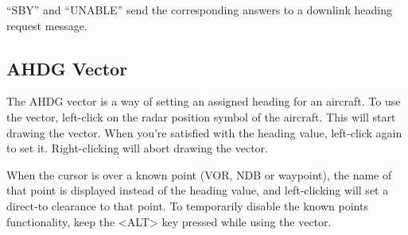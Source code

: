 \documentclass[a4paper,oneside,11pt]{memoir}
\begin{document}
\bigskip

“SBY” and “UNABLE” send the corresponding answers to a downlink heading request
message.


\subsection{AHDG Vector}\label{menu:ahdgv}

The AHDG vector is a way of setting an assigned heading for an aircraft. To use the vector, left-click on the radar position symbol of the aircraft. This will start drawing the vector. When you’re satisfied with the heading value, left-click again to set it. Right-clicking will abort drawing the vector.

\bigskip

When the cursor is over a known point (VOR, NDB or waypoint), the name of that point is displayed instead of the heading value, and left-clicking will set a direct-to clearance to that point. To temporarily disable the known points functionality, keep the <ALT> key pressed while using the vector.
\end{document}
